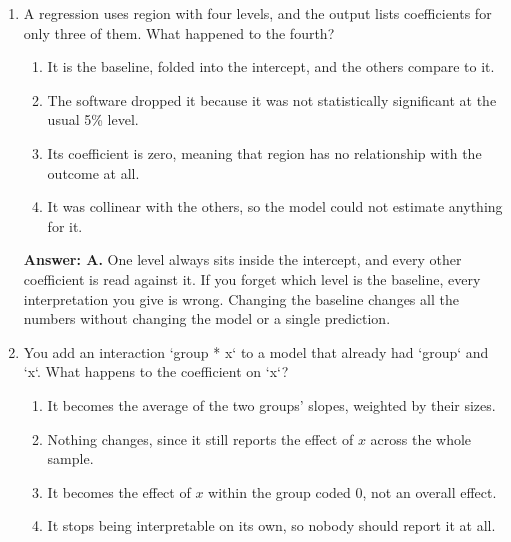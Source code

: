 \documentclass[11pt]{article}
\begin{document}
\begin{enumerate}[itemsep=14pt]
\vspace{2pt}
\textbf{Answer: C.} A 0/1 predictor shifts the line up or down without tilting it, so its coefficient is the gap between two parallel lines. The phrase holding square footage fixed is doing real work here. Without it you would be comparing garage houses to non-garage houses that also differ in size.
\vspace{4pt}

\item A regression uses region with four levels, and the output lists coefficients for only three of them. What happened to the fourth?

\begin{enumerate}[label=\Alph*., itemsep=1pt, topsep=3pt]
  \item It is the baseline, folded into the intercept, and the others compare to it.
  \item The software dropped it because it was not statistically significant at the usual 5\% level.
  \item Its coefficient is zero, meaning that region has no relationship with the outcome at all.
  \item It was collinear with the others, so the model could not estimate anything for it.
\end{enumerate}

\vspace{2pt}
\textbf{Answer: A.} One level always sits inside the intercept, and every other coefficient is read against it. If you forget which level is the baseline, every interpretation you give is wrong. Changing the baseline changes all the numbers without changing the model or a single prediction.
\vspace{4pt}

\item You add an interaction `group * x` to a model that already had `group` and `x`. What happens to the coefficient on `x`?

\begin{enumerate}[label=\Alph*., itemsep=1pt, topsep=3pt]
  \item It becomes the average of the two groups' slopes, weighted by their sizes.
  \item Nothing changes, since it still reports the effect of $x$ across the whole sample.
  \item It becomes the effect of $x$ within the group coded 0, not an overall effect.
  \item It stops being interpretable on its own, so nobody should report it at all.
\end{enumerate}


\end{enumerate}
\end{document}
